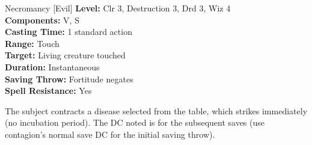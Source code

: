 {Necromancy [Evil]}
{
	\textbf{Level:}
	Clr 3, Destruction 3, Drd 3, Wiz 4\\
	\textbf{Components:}
	V, S\\
	\textbf{Casting Time:}
	1 standard action\\
	\textbf{Range:}
	Touch\\
	\textbf{Target:}
	Living creature touched\\
	\textbf{Duration:}
	Instantaneous\\
	\textbf{Saving Throw:}
	Fortitude negates\\
	\textbf{Spell Resistance:}
	Yes\\
}
{
	The subject contracts a disease selected from the table, which strikes immediately (no incubation period). The DC noted is for the subsequent saves (use contagion's normal save DC for the initial saving throw).


}

